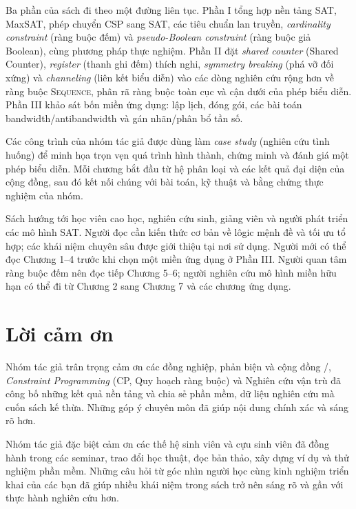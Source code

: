 \documentclass[11pt,a4paper,oneside,openany,headings=normal]{scrbook}
\begin{document}
Ba phần của sách đi theo một đường liên tục. Phần I tổng hợp nền tảng SAT,
MaxSAT, phép chuyển CSP sang SAT, các tiêu chuẩn lan truyền,
\emph{cardinality constraint} (ràng buộc đếm) và
\emph{pseudo-Boolean constraint} (ràng buộc giả Boolean), cùng phương pháp thực
nghiệm. Phần II đặt \emph{shared counter} (Shared Counter),
\emph{register} (thanh ghi đếm) thích nghi,
\emph{symmetry breaking} (phá vỡ đối xứng) và
\emph{channeling} (liên kết biểu diễn) vào các dòng nghiên cứu rộng hơn về ràng buộc
\textsc{Sequence}, phân rã ràng buộc toàn cục và cận dưới của phép biểu diễn.
Phần III khảo sát bốn miền ứng dụng: lập lịch, đóng gói, các bài toán
bandwidth/antibandwidth và gán nhãn/phân bổ tần số.

Các công trình của nhóm tác giả được dùng làm \emph{case study}
(nghiên cứu tình huống) để
minh họa trọn vẹn quá trình hình thành, chứng minh và đánh giá một phép biểu diễn.
Mỗi chương bắt đầu từ hệ phân loại và các kết quả đại diện của cộng đồng, sau
đó kết nối chúng với bài toán, kỹ thuật và bằng chứng thực nghiệm của nhóm.

Sách hướng tới học viên cao học, nghiên cứu sinh, giảng viên và người phát
triển các mô hình SAT. Người đọc cần kiến thức cơ bản về lôgic mệnh đề và tối
ưu tổ hợp; các khái niệm chuyên sâu được giới thiệu tại nơi sử dụng. Người mới
có thể đọc Chương 1--4 trước khi chọn một miền ứng dụng ở Phần III. Người quan
tâm ràng buộc đếm nên đọc tiếp Chương 5--6; người nghiên cứu mô hình miền hữu
hạn có thể đi từ Chương 2 sang Chương 7 và các chương ứng dụng.

\chapter*{Lời cảm ơn}

Nhóm tác giả trân trọng cảm ơn các đồng nghiệp, phản biện và cộng đồng
\SAT/\MaxSAT, \emph{Constraint Programming} (CP, Quy hoạch ràng buộc) và
Nghiên cứu vận trù đã công bố những kết
quả nền tảng và chia sẻ phần mềm, dữ liệu nghiên cứu mà cuốn sách kế thừa.
Những góp ý chuyên môn đã giúp nội dung chính xác và sáng rõ hơn.

Nhóm tác giả đặc biệt cảm ơn các thế hệ sinh viên và cựu sinh viên đã đồng
hành trong các seminar, trao đổi học thuật, đọc bản thảo, xây dựng ví dụ và
thử nghiệm phần mềm. Những câu hỏi từ góc nhìn người học cùng kinh nghiệm triển
khai của các bạn đã giúp nhiều khái niệm trong sách trở nên sáng rõ và gần với
thực hành nghiên cứu hơn.
\end{document}
